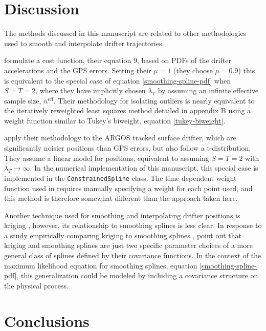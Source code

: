 \documentclass{ametsoc}
\begin{document}
\section{Discussion}

The methods discussed in this manuscript are related to other methodologies used to smooth and interpolate drifter trajectories.

\citet{yaremchuk2015-joe} formulate a cost function, their equation 9, based on PDFs of the drifter accelerations and the GPS errors. Setting their $\mu=1$ (they choose $\mu=0.9$) this is equivalent to the special case of equation \ref{smoothing-spline-pdf} when $S=T=2$, where they have implicitly chosen $\lambda_T$ by assuming an infinite effective sample size, $n^\textrm{eff}$. Their methodology for isolating outliers is nearly equivalent to the iteratively reweighted least squares method detailed in appendix B using a weight function similar to Tukey's biweight, equation \ref{tukey-biweight}.

\citet{elipot2016-jgr} apply their methodology to the ARGOS tracked surface drifter, which are significantly noisier positions than GPS errors, but also follow a t-distribution. They assume a linear model for positions, equivalent to assuming $S=T=2$ with $\lambda_T \rightarrow \infty$. In the numerical implementation of this manuscript, this special case is implemented in the \texttt{ConstrainedSpline} class. The time dependent weight function used in \citet{elipot2016-jgr} requires manually specifying a weight for each point used, and this method is therefore somewhat different than the approach taken here.

Another technique used for smoothing and interpolating drifter positions is kriging \citep{hansen1996-jtech}, however, its relationship to smoothing splines is less clear. In response to a study empirically comparing kriging to smoothing splines \citep{laslett1994-jasa},  \citet{handcock1994-jasa} point out that kriging and smoothing splines are just two specific parameter choices of a more general class of splines defined by their covariance functions. In the context of the maximum likelihood equation for smoothing splines, equation \ref{smoothing-spline-pdf}, this generalization could be modeled by including a covariance structure on the physical process. 

\section{Conclusions}
\end{document}
